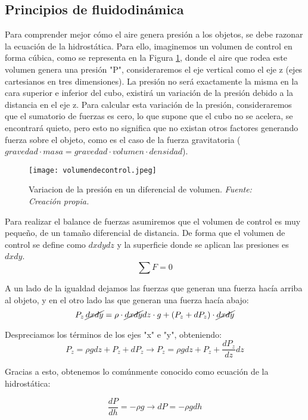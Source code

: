 \subsection{Principios de fluidodinámica}

Para comprender mejor cómo el aire genera presión a los objetos, se debe razonar la ecuación de la hidrostática. Para ello, imaginemos un volumen de control en forma cúbica, como se representa en la Figura \ref{fig:mi_figura2}, donde el aire que rodea este volumen genera una presión "P", consideraremos el eje vertical como el eje z (ejes cartesianos en tres dimensiones). La presión no será exactamente la misma en la cara superior e inferior del cubo, existirá un variación de la presión debido a la distancia en el eje z. Para calcular esta variación de la presión, consideraremos que el sumatorio de fuerzas es cero, lo que supone que el cubo no se acelera, se encontrará quieto, pero esto no significa que no existan otros factores generando fuerza sobre el objeto, como es el caso de la fuerza gravitatoria (\(gravedad \cdot masa = gravedad \cdot volumen \cdot densidad\)).\\

\begin{figure}[H]
    \centering
    \texttt{[image: volumendecontrol.jpeg]}
    \caption{\centering Variacion de la presión en un diferencial de volumen.  \textit{Fuente: Creación propia.}}
	\label{fig:mi_figura2}
\end{figure}

Para realizar el balance de fuerzas asumiremos que el volumen de control es muy pequeño, de un tamaño diferencial de distancia. De forma que el volumen de control se define como \(dxdydz\) y la superficie donde se aplican las presiones es \(dxdy\). 
\[
\sum F = 0
\]

A un lado de la igualdad dejamos las fuerzas que generan una fuerza hacía arriba al objeto, y en el otro lado las que generan una fuerza hacía abajo:
\[
P_z \,  \cancel{dxdy} = \rho \cdot  \cancel{dxdy} dz \cdot g + (P_z + dP_z) \cdot  \cancel{dxdy}
\]

Despreciamos los términos de los ejes "x" e "y", obteniendo:
\[
P_z = \rho g dz + P_z+ dP_z  \rightarrow P_z = \rho g dz + P_z + \frac{dP_z}{dz} dz
\]

Gracias a esto, obtenemos lo comúnmente conocido como ecuación de la hidrostática:
\begin{definicion}
	\begin{equation}
  	  \frac{dP}{dh} = -\rho g \rightarrow dP = -\rho g dh
   	 \label{eq:hydrostatic}
	\end{equation}
\end{definicion}

